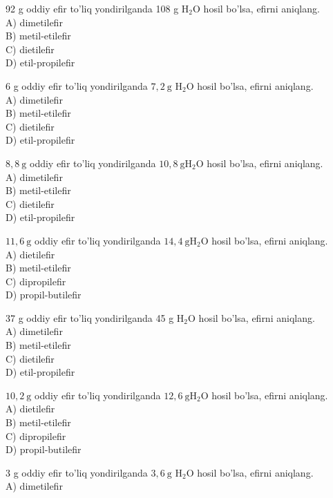   \item 92 g oddiy efir to'liq yondirilganda 108 g $\mathrm{H}_{2} \mathrm{O}$ hosil bo'lsa, efirni aniqlang.\\
A) dimetilefir\\
B) metil-etilefir\\
C) dietilefir\\
D) etil-propilefir
  \item 6 g oddiy efir to'liq yondirilganda $7,2 \mathrm{~g}$ $\mathrm{H}_{2} \mathrm{O}$ hosil bo'lsa, efirni aniqlang.\\
A) dimetilefir\\
B) metil-etilefir\\
C) dietilefir\\
D) etil-propilefir
  \item $8,8 \mathrm{~g}$ oddiy efir to'liq yondirilganda $10,8 \mathrm{~g} \mathrm{H}_{2} \mathrm{O}$ hosil bo'lsa, efirni aniqlang.\\
A) dimetilefir\\
B) metil-etilefir\\
C) dietilefir\\
D) etil-propilefir
  \item $11,6 \mathrm{~g}$ oddiy efir to'liq yondirilganda $14,4 \mathrm{~g} \mathrm{H}_{2} \mathrm{O}$ hosil bo'lsa, efirni aniqlang.\\
A) dietilefir\\
B) metil-etilefir\\
C) dipropilefir\\
D) propil-butilefir
  \item 37 g oddiy efir to'liq yondirilganda 45 g $\mathrm{H}_{2} \mathrm{O}$ hosil bo'lsa, efirni aniqlang.\\
A) dimetilefir\\
B) metil-etilefir\\
C) dietilefir\\
D) etil-propilefir
  \item $10,2 \mathrm{~g}$ oddiy efir to'liq yondirilganda $12,6 \mathrm{~g} \mathrm{H}_{2} \mathrm{O}$ hosil bo'lsa, efirni aniqlang.\\
A) dietilefir\\
B) metil-etilefir\\
C) dipropilefir\\
D) propil-butilefir
  \item 3 g oddiy efir to'liq yondirilganda $3,6 \mathrm{~g}$ $\mathrm{H}_{2} \mathrm{O}$ hosil bo'lsa, efirni aniqlang.\\
A) dimetilefir\\
